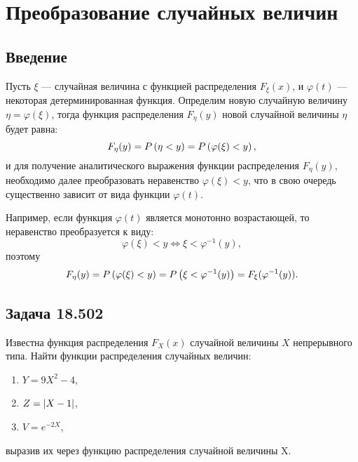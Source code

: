 \chapter{Преобразование случайных величин}

\section*{Введение}
Пусть $\xi$ --- случайная величина с функцией распределения $F_\xi(x)$, и $\varphi(t)$ --- некоторая детерминированная функция. Определим новую случайную величину
$\eta = \varphi(\xi)$, тогда функция распределения $F_\eta(y)$ новой случайной величины $\eta$ будет равна:
\begin{equation}
    F_\eta(y) = P \left ( \eta < y \right ) = P \left ( \varphi(\xi) < y \right ),
\end{equation}
и для получение аналитического выражения функции распределения $F_\eta(y)$, необходимо далее преобразовать неравенство $\varphi(\xi) < y$, что в свою очередь
существенно зависит от вида функции $\varphi(t)$.

Например, если функция $\varphi(t)$ является монотонно возрастающей, то неравенство преобразуется к виду:
\begin{equation}
    \varphi(\xi) < y \Leftrightarrow \xi < \varphi^{-1}(y),
\end{equation}
поэтому
\begin{equation}
    F_\eta(y) = P \left ( \varphi(\xi) < y \right ) = P \left ( \xi < \varphi^{-1}(y) \right ) = F_\xi (\varphi^{-1}(y)) .
\end{equation}

\section*{Задача 18.502}

Известна функция распределения $F_X(x)$ случайной величины $X$ непрерывного типа. Найти функции распределения случайных величин:
\begin{enumerate}
    \item $Y = 9 X^2 - 4$,
    \item $Z = \left | X - 1 \right |$,
    \item $V = e^{-2X}$,
\end{enumerate}
выразив их через функцию распределения случайной величины X.

